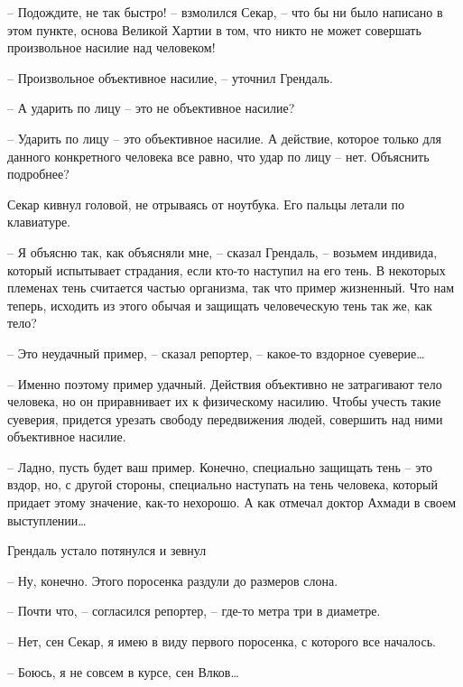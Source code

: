 -- Подождите, не так быстро! -- взмолился Секар, -- что бы ни было написано в этом пункте, основа Великой Хартии в том, что никто не может совершать произвольное насилие над человеком!

-- Произвольное объективное насилие, -- уточнил Грендаль.

-- А ударить по лицу -- это не объективное насилие?

-- Ударить по лицу -- это объективное насилие. А действие, которое только для данного конкретного человека все равно, что удар по лицу -- нет. Объяснить подробнее?

Секар кивнул головой, не отрываясь от ноутбука. Его пальцы летали по клавиатуре.

-- Я объясню так, как объясняли мне, -- сказал Грендаль, -- возьмем индивида, который испытывает страдания, если кто-то наступил на его тень. В некоторых племенах тень считается частью организма, так что пример жизненный. Что нам теперь, исходить из этого обычая и защищать человеческую тень так же, как тело?

-- Это неудачный пример, -- сказал репортер, -- какое-то вздорное суеверие\ldots{}

-- Именно поэтому пример удачный. Действия объективно не затрагивают тело человека, но он приравнивает их к физическому насилию. Чтобы учесть такие суеверия, придется урезать свободу передвижения людей, совершить над ними объективное насилие.

-- Ладно, пусть будет ваш пример. Конечно, специально защищать тень -- это вздор, но, с другой стороны, специально наступать на тень человека, который придает этому значение, как-то нехорошо. А как отмечал доктор Ахмади в своем выступлении\ldots{}

Грендаль устало потянулся и зевнул

-- Ну, конечно. Этого поросенка раздули до размеров слона.

-- Почти что, -- согласился репортер, -- где-то метра три в диаметре.

-- Нет, сен Секар, я имею в виду первого поросенка, с которого все началось.

-- Боюсь, я не совсем в курсе, сен Влков\ldots{}

